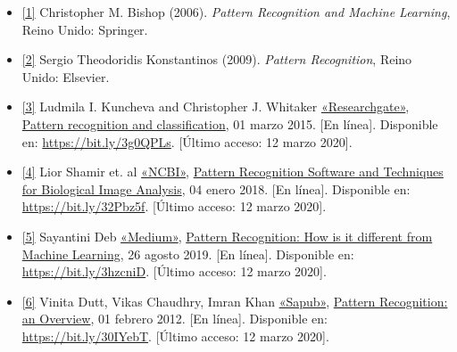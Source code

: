 \documentclass[12pt,spanish,Letterpaper,openany]{book}
\begin{document}
\begin{itemize}
\item
  \hypertarget{articulo12_ref01}{}

  \protect\hyperlink{articulo12_cross01}{{[}1{]}} Christopher M. Bishop (2006). \emph{Pattern Recognition and Machine Learning}, Reino Unido: Springer.
\item
  \hypertarget{articulo12_ref02}{}

  \protect\hyperlink{articulo12_cross02}{{[}2{]}} Sergio Theodoridis Konstantinos (2009). \emph{Pattern Recognition}, Reino Unido: Elsevier.
\item
  \hypertarget{articulo12_ref03}{}

  \protect\hyperlink{articulo12_cross03}{{[}3{]}} Ludmila I. Kuncheva and Christopher J. Whitaker \href{https://www.researchgate.net/}{«Researchgate»}, \href{https://www.researchgate.net/publication/300808572_Pattern_Recognition_and_Classification/}{Pattern recognition and classification}, 01 marzo 2015. {[}En línea{]}. Disponible en: \url{https://bit.ly/3g0QPLs}. {[}Último acceso: 12 marzo 2020{]}.
\item
  \hypertarget{articulo12_ref04}{}

  \protect\hyperlink{articulo12_cross04}{{[}4{]}} Lior Shamir et. al \href{https://www.ncbi.nlm.nih.gov/}{«NCBI»}, \href{https://www.ncbi.nlm.nih.gov/pmc/articles/PMC2991255/}{Pattern Recognition Software and Techniques for Biological Image Analysis}, 04 enero 2018. {[}En línea{]}. Disponible en: \url{https://bit.ly/32Pbz5f}. {[}Último acceso: 12 marzo 2020{]}.
\item
  \hypertarget{articulo12_ref05}{}

  \protect\hyperlink{articulo12_cross05}{{[}5{]}} Sayantini Deb \href{https://medium.com}{«Medium»}, \href{https://medium.com/edureka/pattern-recognition-5e2d30ab68b9}{Pattern Recognition: How is it different from Machine Learning}, 26 agosto 2019. {[}En línea{]}. Disponible en: \url{https://bit.ly/3hzcniD}. {[}Último acceso: 12 marzo 2020{]}.
\item
  \hypertarget{articulo12_ref07}{}

  \protect\hyperlink{articulo12_cross06}{{[}6{]}} Vinita Dutt, Vikas Chaudhry, Imran Khan \href{http://article.sapub.org}{«Sapub»}, \href{http://article.sapub.org/pdf/10.5923.j.ajis.20120201.04.pdf}{Pattern Recognition: an Overview}, 01 febrero 2012. {[}En línea{]}. Disponible en: \url{https://bit.ly/30IYebT}. {[}Último acceso: 12 marzo 2020{]}.
\end{itemize}
\end{document}
